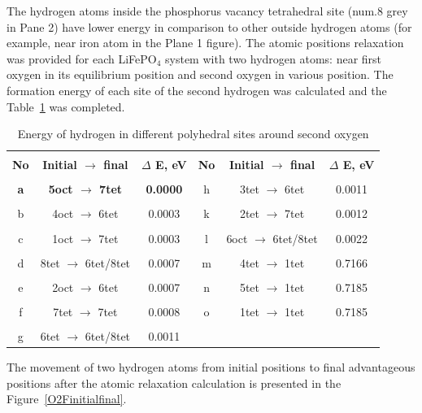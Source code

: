 The hydrogen atoms inside the phosphorus vacancy tetrahedral site (num.8 grey in Pane 2) have lower energy in comparison to other outside hydrogen atoms (for example, near iron atom in the Plane 1 figure). The atomic positions relaxation was provided for each LiFePO$_4$ system with two hydrogen atoms: near first oxygen in its equilibrium position and second oxygen in various position. The formation energy of each site of the second hydrogen was calculated and the Table~\ref{energy2} was completed.

\begin{table}[h!]
\caption{Energy of hydrogen in different polyhedral sites around second oxygen}
\label{energy2}
\begin{center}
\begin{tabular}{|c|c|c|c|c|c|}
\hline
& & & & &\\
 \textbf{No} & \textbf{Initial $\rightarrow$ final} & \textbf{$\Delta$ E, eV} & \textbf{No} & \textbf{Initial $\rightarrow$ final} & \textbf{$\Delta$ E, eV}\\ 
\hline
& & & & &\\
\textbf{a} & \textbf{5oct $\rightarrow$ 7tet} & \textbf{0.0000} & h & 3tet $\rightarrow$ 6tet & 0.0011 \\
\hline
& & & & &\\
b & 4oct $\rightarrow$ 6tet & 0.0003 & k & 2tet $\rightarrow$ 7tet & 0.0012 \\
\hline
& & & & &\\
c & 1oct $\rightarrow$ 7tet & 0.0003 & l & 6oct $\rightarrow$ 6tet/8tet & 0.0022\\
\hline
& & & & &\\
d & 8tet $\rightarrow$ 6tet/8tet & 0.0007 & m & 4tet $\rightarrow$ 1tet & 0.7166\\
\hline
& & & & &\\
e & 2oct $\rightarrow$ 6tet & 0.0007 & n & 5tet $\rightarrow$ 1tet & 0.7185\\
\hline
& & & & &\\
f & 7tet $\rightarrow$ 7tet & 0.0008 & o & 1tet $\rightarrow$ 1tet & 0.7185 \\
\hline
& & & & &\\
g & 6tet $\rightarrow$ 6tet/8tet & 0.0011 & & & \\
\hline
\end{tabular}
\end{center}
\end{table}

The movement of two hydrogen atoms from initial positions to final advantageous positions after the atomic relaxation calculation is presented in the Figure~\ref{O2Finitialfinal}.

